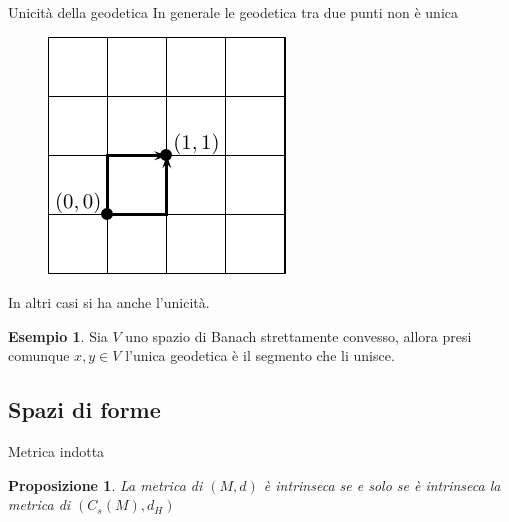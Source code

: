 \documentclass{beamer}
\newcounter{counter1}
\theoremstyle{plain}
\newtheorem{mypro}[counter1]{Proposizione}
\theoremstyle{definition}
\newtheorem{myes}[counter1]{Esempio}
\theoremstyle{remark}
\newcommand{\obar}[1]{\overline{#1}}
\newcommand{\set}[1]{\left\{#1\right\}}
\newcommand{\bra}[1]{\left[#1\right]}
\newcommand{\abs}[1]{\left|#1\right|}
\DeclareMathOperator{\len}{len}
\begin{document}
\begin{frame}{Unicità della geodetica}
  In generale le geodetica tra due punti non è unica
  \begin{figure}[h]
    \includegraphics[scale=0.4]{griglia.pdf}
  \end{figure}
  In altri casi si ha anche l'unicità.
  \begin{myes}
    Sia $V$ uno spazio di Banach strettamente convesso, allora presi
    comunque $x,y \in V$ l'unica geodetica è il segmento che li unisce.
  \end{myes}
\end{frame}

\subsection{Spazi di forme}

\begin{frame}{Metrica indotta}
  \begin{mypro}
    La metrica di $(M,d)$ è intrinseca se e solo se è intrinseca la
    metrica di $(C_s(M),d_H)$
  \end{mypro}
\end{frame}



\end{document}
